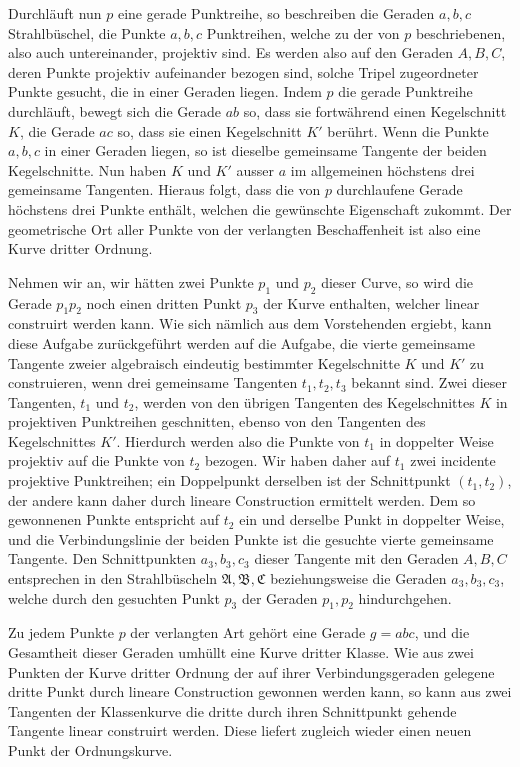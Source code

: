 \documentclass[11pt]{article}
\begin{document}
Durchläuft nun $p$ eine gerade Punktreihe, so beschreiben die Geraden $a,b,c$ Strahlbüschel, die Punkte $a,b,c$ Punktreihen, welche zu der von $p$ beschriebenen, also auch untereinander, projektiv sind. Es werden also auf den Geraden $A,B,C$, deren Punkte projektiv aufeinander bezogen sind, solche Tripel zugeordneter Punkte gesucht, die in einer Geraden liegen. Indem $p$ die gerade Punktreihe durchläuft, bewegt sich die Gerade $ab$ so, dass sie fortwährend einen Kegelschnitt $K$, die Gerade $ac$ so, dass sie einen Kegelschnitt $K'$ berührt. Wenn die Punkte $a,b,c$ in einer Geraden liegen, so ist dieselbe gemeinsame Tangente der beiden Kegelschnitte. Nun haben $K$ und $K'$ ausser $a$ im allgemeinen höchstens drei gemeinsame Tangenten. Hieraus folgt, dass die von $p$ durchlaufene Gerade höchstens drei Punkte enthält, welchen die gewünschte Eigenschaft zukommt. Der geometrische Ort aller Punkte von der verlangten Beschaffenheit ist also eine Kurve dritter Ordnung.

Nehmen wir an, wir hätten zwei Punkte $p_1$ und $p_2$ dieser Curve, so wird die Gerade $p_1p_2$ noch einen dritten Punkt $p_3$ der Kurve enthalten, welcher linear construirt werden kann. Wie sich nämlich aus dem Vorstehenden ergiebt, kann diese Aufgabe zurückgeführt werden auf die Aufgabe, die vierte gemeinsame Tangente zweier algebraisch eindeutig bestimmter Kegelschnitte $K$ und $K'$ zu construieren, wenn drei gemeinsame Tangenten $t_1,t_2,t_3$ bekannt sind. Zwei dieser Tangenten, $t_1$ und $t_2$, werden von den übrigen Tangenten des Kegelschnittes $K$ in projektiven Punktreihen geschnitten, ebenso von den Tangenten des Kegelschnittes $K'$. Hierdurch werden also die Punkte von $t_1$ in doppelter Weise projektiv auf die Punkte von $t_2$ bezogen. Wir haben daher auf $t_1$ zwei incidente projektive Punktreihen; ein Doppelpunkt derselben ist der Schnittpunkt $(t_1,t_2)$, der andere kann daher durch lineare Construction ermittelt werden. Dem so gewonnenen Punkte entspricht auf $t_2$ ein und derselbe Punkt in doppelter Weise, und die Verbindungslinie der beiden Punkte ist die gesuchte vierte gemeinsame Tangente. Den Schnittpunkten $a_3,b_3,c_3$ dieser Tangente mit den Geraden $A,B,C$ entsprechen in den Strahlbüscheln $\mathfrak A,\mathfrak B,\mathfrak C$ beziehungsweise die Geraden $a_3,b_3,c_3$, welche durch den gesuchten Punkt $p_3$ der Geraden $p_1,p_2$ hindurchgehen.

Zu jedem Punkte $p$ der verlangten Art gehört eine Gerade $g=abc$, und die Gesamtheit dieser Geraden umhüllt eine Kurve dritter Klasse. Wie aus zwei Punkten der Kurve dritter Ordnung der auf ihrer Verbindungsgeraden gelegene dritte Punkt durch lineare Construction gewonnen werden kann, so kann aus zwei Tangenten der Klassenkurve die dritte durch ihren Schnittpunkt gehende Tangente linear construirt werden. Diese liefert zugleich wieder einen neuen Punkt der Ordnungskurve.
\end{document}

